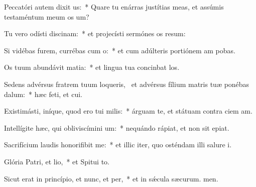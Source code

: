 \item Peccatóri autem dixit us:~* Quare tu enárras justítias meas, et assúmis testaméntum meum  os um?
\item Tu vero odísti discinam:~* et projecísti sermónes os resum:
\item Si vidébas furem, currébas cum o:~* et cum adúlteris portiónem am pobas.
\item Os tuum abundávit matia:~* et lingua tua concinbat los.
\item Sedens advérsus fratrem tuum loqueris,~\pscross{} et advérsus fílium matris tuæ ponébas dalum:~* hæc feti, et cui.
\item Existimásti, iníque, quod ero tui milis:~* árguam te, et státuam contra ciem am.
\item Intellígite hæc, qui obliviscímini um:~* nequándo rápiat, et non sit  epiat.
\item Sacrifícium laudis honorifibit me:~* et illic iter, quo osténdam illi salure i.
\item Glória Patri, et lio,~* et Spitui to.
\item Sicut erat in princípio, et nunc, et per,~* et in sǽcula sæcurum. men.
